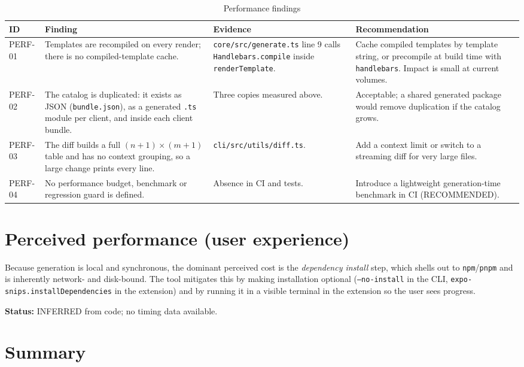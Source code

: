 \begin{longtable}{p{1.4cm}p{4cm}p{4cm}p{4.4cm}}
\caption{Performance findings}\\
\toprule
\textbf{ID} & \textbf{Finding} & \textbf{Evidence} & \textbf{Recommendation} \\
\midrule

PERF-01 & Templates are recompiled on every render; there is no compiled-template
cache. & \texttt{core/src/generate.ts} line 9 calls
\texttt{Handlebars.compile} inside \texttt{renderTemplate}. & Cache compiled
templates by template string, or precompile at build time with
\texttt{handlebars}. Impact is small at current volumes. \\
PERF-02 & The catalog is duplicated: it exists as JSON
(\texttt{bundle.json}), as a generated \texttt{.ts} module per client, and inside
each client bundle. & Three copies measured above. & Acceptable; a shared
generated package would remove duplication if the catalog grows. \\
PERF-03 & The diff builds a full $(n+1)\times(m+1)$ table and has no context
grouping, so a large change prints every line. & \texttt{cli/src/utils/diff.ts}. &
Add a context limit or switch to a streaming diff for very large files. \\
PERF-04 & No performance budget, benchmark or regression guard is defined. &
Absence in CI and tests. & Introduce a lightweight generation-time benchmark in
CI (RECOMMENDED). \\
\bottomrule
\end{longtable}

\section{Perceived performance (user experience)}

Because generation is local and synchronous, the dominant perceived cost is the
\emph{dependency install} step, which shells out to \texttt{npm}/\texttt{pnpm}
and is inherently network- and disk-bound. The tool mitigates this by making
installation optional (\texttt{--no-install} in the CLI,
\texttt{expo-snips.installDependencies} in the extension) and by running it in a
visible terminal in the extension so the user sees progress.

\textbf{Status:} INFERRED from code; no timing data available.

\section{Summary}

